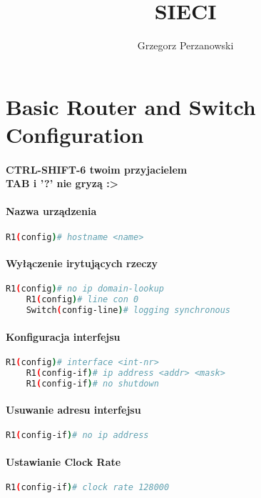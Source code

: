\documentclass[12pt]{article}
\title{SIECI}
\author{Grzegorz Perzanowski}
\begin{document}
	\maketitle
	\newpage
	\tableofcontents
	\newpage


\section{Basic Router and Switch Configuration}

	\paragraph{CTRL-SHIFT-6 twoim przyjacielem\\ TAB i '?' nie gryzą :>}
	
	\paragraph{Nazwa urządzenia}
	\begin{lstlisting}[language=bash]
	R1(config)# hostname <name>
	\end{lstlisting}
		
	\paragraph{Wyłączenie irytujących rzeczy}
	\begin{lstlisting}[language=bash]
	R1(config)# no ip domain-lookup
	R1(config)# line con 0
	Switch(config-line)# logging synchronous 
	\end{lstlisting}
		
	\paragraph{Konfiguracja interfejsu}
	\begin{lstlisting}[language=bash]
	R1(config)# interface <int-nr>
	R1(config-if)# ip address <addr> <mask>
	R1(config-if)# no shutdown
	\end{lstlisting}
		
	\paragraph{Usuwanie adresu interfejsu}
	\begin{lstlisting}[language=bash]
	R1(config-if)# no ip address 
	\end{lstlisting}
		
	\paragraph{Ustawianie Clock Rate}
	\begin{lstlisting}[language=bash]
	R1(config-if)# clock rate 128000
	\end{lstlisting}
	
\end{document}
